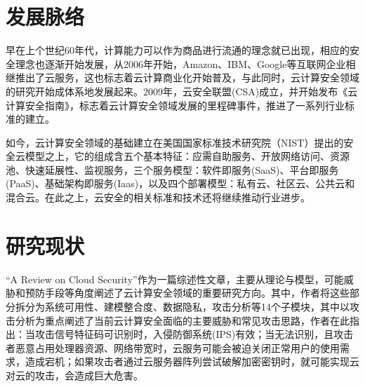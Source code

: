 \documentclass[a4paper, 12pt, conference]{ieeeconf}      %
\begin{document}
\section{发展脉络}
早在上个世纪60年代，计算能力可以作为商品进行流通的理念就已出现，相应的安全理念也逐渐开始发展，从2006年开始，Amazon、IBM、Google等互联网企业相继推出了云服务，这也标志着云计算商业化开始普及，与此同时，云计算安全领域的研究开始成体系地发展起来。2009年，云安全联盟(CSA)成立，并开始发布《云计算安全指南》，标志着云计算安全领域发展的里程碑事件，推进了一系列行业标准的建立。

如今，云计算安全领域的基础建立在美国国家标准技术研究院（NIST）提出的安全云模型之上，它的组成含五个基本特征：应需自助服务、开放网络访问、资源池、快速延展性、监视服务，三个服务模型：软件即服务(SaaS)、平台即服务(PaaS)、基础架构即服务(Iaas)，以及四个部署模型：私有云、社区云、公共云和混合云。在此之上，云安全的相关标准和技术还将继续推动行业进步。


\section{研究现状}
“A Review on Cloud Security”作为一篇综述性文章，主要从理论与模型，可能威胁和预防手段等角度阐述了云计算安全领域的重要研究方向。其中，作者将这些部分拆分为系统可用性、建模整合度、数据隐私，攻击分析等14个子模块，其中以攻击分析为重点阐述了当前云计算安全面临的主要威胁和常见攻击思路，作者在此指出：当攻击信号特征码可识别时，入侵防御系统(IPS)有效；当无法识别，且攻击者恶意占用处理器资源、网络带宽时，云服务可能会被迫关闭正常用户的使用需求，造成宕机；如果攻击者通过云服务器阵列尝试破解加密密钥时，就可能实现云对云的攻击，会造成巨大危害\cite{10.1145/2523514.2527013}。
\end{document}

